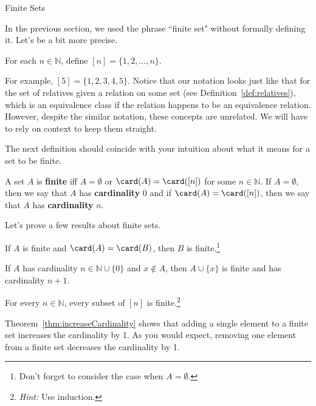\begin{section}{Finite Sets}

In the previous section, we used the phrase ``finite set" without formally defining it. Let's be a bit more precise.

\begin{definition}
For each $n\in \mathbb{N}$, define $[n]=\{1,2,\ldots,n\}$.
\end{definition}

For example, $[5]=\{1,2,3,4,5\}$.  Notice that our notation looks just like that for the set of relatives given a relation on some set (see Definition~\ref{def:relatives}), which is an equivalence class if the relation happens to be an equivalence relation.  However, despite the similar notation, these concepts are unrelated. We will have to rely on context to keep them straight.

The next definition should coincide with your intuition about what it means for a set to be finite.

\begin{definition}
A set $A$ is \textbf{finite} iff $A=\emptyset$ or $\card(A)=\card([n])$ for some $n\in\mathbb{N}$. If $A=\emptyset$, then we say that $A$ has \textbf{cardinality} 0 and if $\card(A)=\card([n])$, then we say that $A$ has \textbf{cardinality} $n$.
\end{definition}

Let's prove a few results about finite sets.

\begin{theorem}\label{thm:finiteSetsSameCardinality}
If $A$ is finite and $\card(A)=\card(B)$, then $B$ is finite.\footnote{Don't forget to consider the case when $A=\emptyset$.}
\end{theorem}

\begin{theorem}\label{thm:increaseCardinality}
If $A$ has cardinality $n\in\mathbb{N}\cup\{0\}$ and $x\notin A$, then $A\cup\{x\}$ is finite and has cardinality $n+1$.
\end{theorem}

\begin{theorem}\label{thm:subsetsFiniteSets}
For every $n\in\mathbb{N}$, every subset of $[n]$ is finite.\footnote{\emph{Hint:} Use induction.}
\end{theorem}

Theorem~\ref{thm:increaseCardinality} shows that adding a single element to a finite set increases the cardinality by 1. As you would expect, removing one element from a finite set decreases the cardinality by 1.


\end{section}
